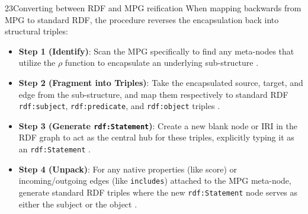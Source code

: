 \begin{question}{2}{3}{Converting between RDF and MPG reification}
When mapping backwards from MPG to standard RDF, the procedure reverses the encapsulation back into structural triples:
\begin{itemize}
    \item \textbf{Step 1 (Identify)}: Scan the MPG specifically to find any meta-nodes that utilize the $\rho$ function to encapsulate an underlying sub-structure \cite{sadoughi_meta-property_2025}.
    \item \textbf{Step 2 (Fragment into Triples)}: Take the encapsulated source, target, and edge from the sub-structure, and map them respectively to standard RDF \texttt{rdf:subject}, \texttt{rdf:predicate}, and \texttt{rdf:object} triples \cite{hernandez_reifying_nodate}.
    \item \textbf{Step 3 (Generate \texttt{rdf:Statement})}: Create a new blank node or IRI in the RDF graph to act as the central hub for these triples, explicitly typing it as an \texttt{rdf:Statement} \cite{cyganiak_rdf_2014}.
    \item \textbf{Step 4 (Unpack)}: For any native properties (like score) or incoming/outgoing edges (like \texttt{includes}) attached to the MPG meta-node, generate standard RDF triples where the new \texttt{rdf:Statement} node serves as either the subject or the object \cite{hernandez_reifying_nodate}.
\end{itemize}
\begin{figure}[htbp]
\centering
{}
\end{figure}
\end{question}
